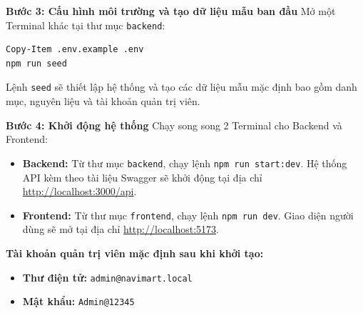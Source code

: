 \documentclass[../main.tex]{subfiles}
\begin{document}
\textbf{Bước 3: Cấu hình môi trường và tạo dữ liệu mẫu ban đầu}
Mở một Terminal khác tại thư mục \texttt{backend}:
\begin{verbatim}
Copy-Item .env.example .env
npm run seed
\end{verbatim}
Lệnh \texttt{seed} sẽ thiết lập hệ thống và tạo các dữ liệu mẫu mặc định bao gồm danh mục, nguyên liệu và tài khoản quản trị viên.

\textbf{Bước 4: Khởi động hệ thống}
Chạy song song 2 Terminal cho Backend và Frontend:
\begin{itemize}
    \item \textbf{Backend:} Từ thư mục \texttt{backend}, chạy lệnh \texttt{npm run start:dev}. Hệ thống API kèm theo tài liệu Swagger sẽ khởi động tại địa chỉ \url{http://localhost:3000/api}.
    \item \textbf{Frontend:} Từ thư mục \texttt{frontend}, chạy lệnh \texttt{npm run dev}. Giao diện người dùng sẽ mở tại địa chỉ \url{http://localhost:5173}.
\end{itemize}

\textbf{Tài khoản quản trị viên mặc định sau khi khởi tạo:}
\begin{itemize}
    \item \textbf{Thư điện tử:} \texttt{admin@navimart.local}
    \item \textbf{Mật khẩu:} \texttt{Admin@12345}
\end{itemize}
\end{document}
